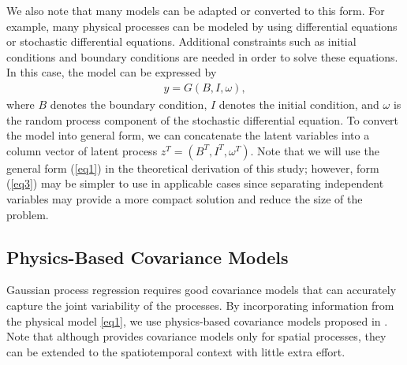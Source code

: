 \documentclass[article,ij4uq]{ij4uq}              %
\begin{document}
\par We also note that many models can be adapted or converted to this form. For example, many physical processes can be modeled by using differential equations or stochastic differential equations. Additional constraints such as initial conditions and boundary conditions are needed in order to solve these equations. In this case, the model can be expressed by
\begin{align}
    y = G(B,I,\omega),\label{eq3}
\end{align}
where $B$ denotes the boundary condition, $I$ denotes the initial condition, and $\omega$ is the random process component of the stochastic differential equation. To convert the model into general form, we can concatenate the latent variables into a column vector of latent process $z^{T}=(B^{T},I^{T},\omega^{T})$. Note that we will use the general form (\ref{eq1}) in the theoretical derivation of this study; however, form (\ref{eq3}) may be simpler to use in applicable cases since separating independent variables may provide a more compact solution and reduce the size of the problem.

\subsection{Physics-Based Covariance Models}
\par Gaussian process regression requires good covariance models that can accurately capture the joint variability of the processes. By incorporating information from the physical model \eqref{eq1}, we use physics-based covariance models proposed in \cite{CovModel}. Note that although \cite{CovModel} provides covariance models only  for spatial processes, they can be extended to the  spatiotemporal context with little extra effort.
\end{document}
